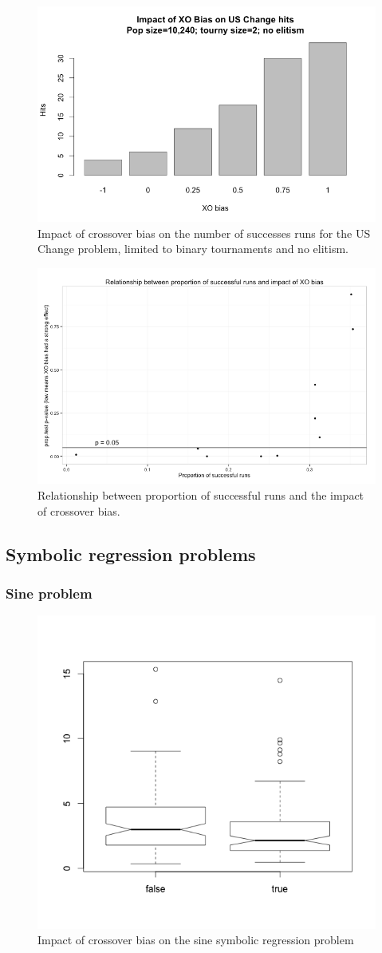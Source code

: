 \documentclass{sig-alternate}
\begin{document}
\begin{figure}
\centering
\includegraphics[width=0.45 \textwidth]{Plots/US_change_successes_tourny2_noElitism.png}
\caption{Impact of crossover bias on the number of successes runs for the US Change problem, limited to 
binary tournaments and no elitism.}
\label{fig:USChange_Successes}
\end{figure}


\begin{figure}
\centering
\includegraphics[width=0.45 \textwidth]{Plots/US_change_Bias_impact_vs_success.png}
\caption{Relationship between proportion of successful runs and the impact of crossover bias.}
\label{fig:USChangeBiasImpactVsSuccess}
\end{figure}

\subsection{Symbolic regression problems}

\subsubsection{Sine problem}

\begin{figure}
\centering
\includegraphics[width=0.45 \textwidth]{Plots/Sine_bias_results.png}
\caption{Impact of crossover bias on the sine symbolic regression problem}
\label{fig:sineBiasResults}
\end{figure}
\end{document}
